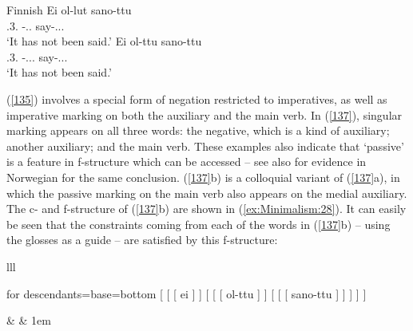 \documentclass[output=paper,hidelinks]{langscibook}
\begin{document}
\ea\label{137} Finnish
\ea
\gll Ei ol-lut sano-ttu\\  %
\NEG.3.{\SG} \PRF-\PST.\PTCP.{\SG} say-\PASS.\PST.\PTCP.{\SG}\\
\glt `It has not been said.'
\ex
\gll Ei ol-ttu sano-ttu\\  %
{\NEG}.3.{\SG} \PRF-\PASS.\PST.\PTCP.{\SG} say-\PASS.\PST.\PTCP.{\SG}\\
\glt `It has not been said.'
\z\z

(\ref{135}) involves a special form of negation restricted to
imperatives, as well as imperative marking on both the auxiliary and
the main verb. In (\ref{137}), singular marking appears on all three
words: the negative, which is a kind of auxiliary; another auxiliary;
and the main verb. These examples also indicate that `passive' is a
feature in f-structure which can be accessed -- see also
\citet{Lodrup2014} for evidence in Norwegian for the same conclusion.
(\ref{137}b) is a colloquial variant of (\ref{137}a), in which the passive
marking on the main verb also appears on the medial auxiliary. The c-
and f-structure of (\ref{137}b) are shown in (\ref{ex:Minimalism:28}). It can easily be
seen that the constraints coming from each of the words in (\ref{137}b)
-- using the glosses as a guide -- are satisfied by this f-structure:

\ea\label{ex:Minimalism:28}
\begin{tabular}[t]{lll}
\begin{forest}
  for descendants={base=bottom}
  [   [  [ ei ] ] 
      [ 
        [  [ ol-ttu ] ]
          [  [  [ sano-ttu ] ] ]
      ]
   ]    
\end{forest}
& \phantom{more space} &
\lower1em\hbox{}
\end{tabular}
\z
\end{document}
